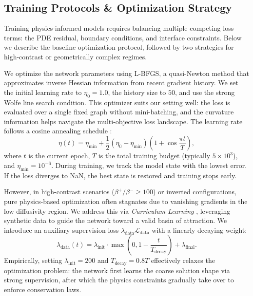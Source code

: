 \documentclass[11pt]{article}
\theoremstyle{definition}
\theoremstyle{remark}
\theoremstyle{plain}
\begin{document}
\subsection{Training Protocols \& Optimization Strategy}
\label{sec:training}

Training physics-informed models requires balancing multiple competing loss terms: the PDE residual, boundary conditions, and interface constraints. Below we describe the baseline optimization protocol, followed by two strategies for high-contrast or geometrically complex regimes.

We optimize the network parameters using L-BFGS, a quasi-Newton method that approximates inverse Hessian information from recent gradient history. We set the initial learning rate to $\eta_0 = 1.0$, the history size to $50$, and use the strong Wolfe line search condition. This optimizer suits our setting well: the loss is evaluated over a single fixed graph without mini-batching, and the curvature information helps navigate the multi-objective loss landscape. The learning rate follows a cosine annealing schedule \cite{loshchilov2016sgdr}:
\begin{equation}
    \eta(t) = \eta_{\min} + \frac{1}{2}(\eta_0 - \eta_{\min}) \left( 1 + \cos\frac{\pi t}{T} \right),
\end{equation}
where $t$ is the current epoch, $T$ is the total training budget (typically $5 \times 10^3$), and $\eta_{\min} = 10^{-6}$. During training, we track the model state with the lowest error. If the loss diverges to NaN, the best state is restored and training stops early.

However, in high-contrast scenarios ($\beta^+ / \beta^- \ge 100$) or inverted configurations, pure physics-based optimization often stagnates due to vanishing gradients in the low-diffusivity region. We address this via \textit{Curriculum Learning} \cite{bengio2009curriculum}, leveraging synthetic data to guide the network toward a valid basin of attraction. We introduce an auxiliary supervision loss $\lambda_{\text{data}} \mathcal{L}_{\text{data}}$ with a linearly decaying weight:
\begin{equation}
    \lambda_{\text{data}}(t) = \lambda_{\text{init}} \cdot \max\left(0, 1 - \frac{t}{T_{\text{decay}}}\right) + \lambda_{\text{final}}.
\end{equation}
Empirically, setting $\lambda_{\text{init}} = 200$ and $T_{\text{decay}} = 0.8T$ effectively relaxes the optimization problem: the network first learns the coarse solution shape via strong supervision, after which the physics constraints gradually take over to enforce conservation laws.
\end{document}
